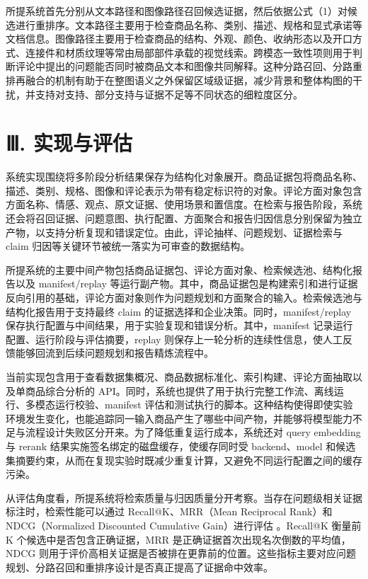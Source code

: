 \documentclass[11pt]{article}
\begin{document}
所提系统首先分别从文本路径和图像路径召回候选证据，然后依据公式（1）对候选进行重排序。文本路径主要用于检查商品名称、类别、描述、规格和显式承诺等文档信息。图像路径主要用于检查商品的结构、外观、颜色、收纳形态以及开口方式、连接件和材质纹理等常由局部部件承载的视觉线索。跨模态一致性项则用于判断评论中提出的问题能否同时被商品文本和图像共同解释。这种分路召回、分路重排再融合的机制有助于在整图语义之外保留区域级证据，减少背景和整体构图的干扰，并支持对支持、部分支持与证据不足等不同状态的细粒度区分。

\section{Ⅲ. 实现与评估}
系统实现围绕将多阶段分析结果保存为结构化对象展开。商品证据包将商品名称、描述、类别、规格、图像和评论表示为带有稳定标识符的对象。评论方面对象包含方面名称、情感、观点、原文证据、使用场景和置信度。在检索与报告阶段，系统还会将召回证据、问题意图、执行配置、方面聚合和报告归因信息分别保留为独立产物，以支持分析复现和错误定位。由此，评论抽样、问题规划、证据检索与 claim 归因等关键环节被统一落实为可审查的数据结构。

所提系统的主要中间产物包括商品证据包、评论方面对象、检索候选池、结构化报告以及 manifest/replay 等运行副产物。其中，商品证据包是构建索引和进行证据反向引用的基础，评论方面对象则作为问题规划和方面聚合的输入。检索候选池与结构化报告用于支持最终 claim 的证据选择和企业决策。同时，manifest/replay 保存执行配置与中间结果，用于实验复现和错误分析。其中，manifest 记录运行配置、运行阶段与评估摘要，replay 则保存上一轮分析的连续性信息，使人工反馈能够回流到后续问题规划和报告精炼流程中。

当前实现包含用于查看数据集概况、商品数据标准化、索引构建、评论方面抽取以及单商品综合分析的 API。同时，系统也提供了用于执行完整工作流、离线运行、多模态运行校验、manifest 评估和测试执行的脚本。这种结构使得即使实验环境发生变化，也能追踪同一输入商品产生了哪些中间产物，并能够将模型能力不足与流程设计失败区分开来。为了降低重复运行成本，系统还对 query embedding 与 rerank 结果实施签名绑定的磁盘缓存，使缓存同时受 backend、model 和候选集摘要约束，从而在复现实验时既减少重复计算，又避免不同运行配置之间的缓存污染。

从评估角度看，所提系统将检索质量与归因质量分开考察。当存在问题级相关证据标注时，检索性能可以通过 Recall@K、MRR（Mean Reciprocal Rank）和 NDCG（Normalized Discounted Cumulative Gain）进行评估 \citep{geng2023grammarConstrainedDecoding}。Recall@K 衡量前 K 个候选中是否包含正确证据，MRR 是正确证据首次出现名次倒数的平均值，NDCG 则用于评价高相关证据是否被排在更靠前的位置。这些指标主要对应问题规划、分路召回和重排序设计是否真正提高了证据命中效率。
\end{document}
